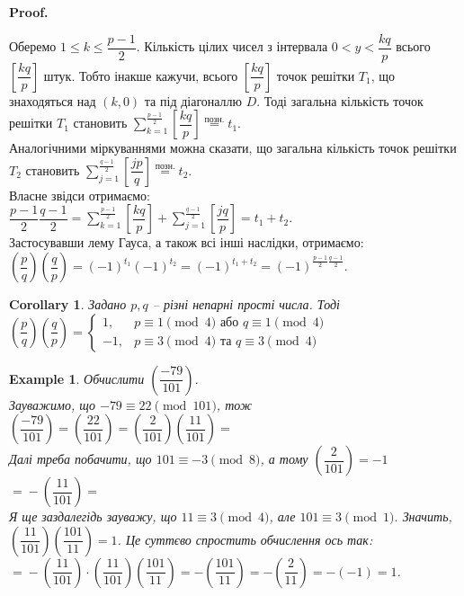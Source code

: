 \documentclass[a4paper, 14pt]{extarticle}
\makeatletter
\theoremstyle{theoremdd}
\theoremstyle{theoremdd}
\theoremstyle{theoremdd}
\theoremstyle{theoremdd}
\newtheorem{example}[theorem]{Example}
\theoremstyle{theoremdd}
\theoremstyle{theoremdd}
\theoremstyle{theoremdd}
\theoremstyle{theoremdd}
\newtheorem{corollary}[theorem]{Corollary}
\def\qed{$\blacksquare$}
\renewenvironment{proof}[1][Proof.\\]{\par
\pushQED{\hfill \qed}%
\normalfont \topsep6\p@\@plus6\p@\relax
\trivlist
\item\relax
{\bfseries
#1\@addpunct{.}}\hspace\labelsep\ignorespaces
}{%
\popQED\endtrivlist\@endpefalse
}
\makeatother
\begin{document}
\begin{proof}
\begin{figure}[H]
\end{figure}
Оберемо $1 \leq k \leq \dfrac{p-1}{2}$. Кількість цілих чисел з інтервала $0 < y < \dfrac{kq}{p}$ всього $\left[ \dfrac{kq}{p} \right]$ штук. Тобто інакше кажучи, всього $\left[ \dfrac{kq}{p} \right]$ точок решітки $T_1$, що знаходяться над $(k,0)$ та під діагоналлю $D$. Тоді загальна кількість точок решітки $T_1$ становить $\displaystyle\sum_{k=1}^{\frac{p-1}{2}} \left[ \dfrac{kq}{p} \right] \overset{\text{позн.}}{=} t_1$.\\
Аналогічними міркуваннями можна сказати, що загальна кількість точок решітки $T_2$ становить $\displaystyle\sum_{j=1}^{\frac{q-1}{2}} \left[ \dfrac{jp}{q} \right] \overset{\text{позн.}}{=} t_2$.\\
Власне звідси отримаємо:\\
$\dfrac{p-1}{2} \dfrac{q-1}{2} = \displaystyle\sum_{k=1}^{\frac{p-1}{2}} \left[ \dfrac{kq}{p} \right] + \sum_{j=1}^{\frac{q-1}{2}} \left[ \dfrac{jq}{p} \right] = t_1 + t_2$.\\
Застосувавши лему Гауса, а також всі інші наслідки, отримаємо:\\
$\left( \dfrac{p}{q} \right) \left( \dfrac{q}{p} \right) = (-1)^{t_1} (-1)^{t_2} = (-1)^{t_1+t_2} = (-1)^{\textstyle\frac{p-1}{2} \frac{q-1}{2}}$.
\end{proof}

\begin{corollary}
Задано $p,q$ -- різні непарні прості числа. Тоді\\
$\left( \dfrac{p}{q} \right) \left( \dfrac{q}{p} \right) = \begin{cases} 1, & p \equiv 1 \pmod 4 \text{ або } q \equiv 1 \pmod 4 \\ -1, & p \equiv 3 \pmod 4 \text{ та } q \equiv 3 \pmod 4 \end{cases}$
\end{corollary}

\begin{example}
Обчислити $\left( \dfrac{-79}{101} \right)$.\\
Зауважимо, що $-79 \equiv 22 \pmod{101}$, тож\\
 $\left( \dfrac{-79}{101} \right) = \left( \dfrac{22}{101} \right) = \left( \dfrac{2}{101} \right) \left( \dfrac{11}{101} \right) \boxed{=}$\\
Далі треба побачити, що $101 \equiv -3 \pmod 8$, а тому $\left( \dfrac{2}{101} \right) = -1$\\
$\boxed{=} - \left( \dfrac{11}{101} \right) \boxed{=}$\\
Я ще заздалегідь зауважу, що $11 \equiv 3 \pmod 4$, але $101 \equiv 3 \pmod 1$. Значить, $\left( \dfrac{11}{101} \right) \left( \dfrac{101}{11} \right) = 1$. Це суттєво спростить обчислення ось так:\\
$\boxed{=} - \left( \dfrac{11}{101} \right) \cdot \left( \dfrac{11}{101} \right) \left( \dfrac{101}{11} \right) = -\left( \dfrac{101}{11} \right) = -\left( \dfrac{2}{11} \right) = -(-1) = 1$.
\end{example}
\end{document}
